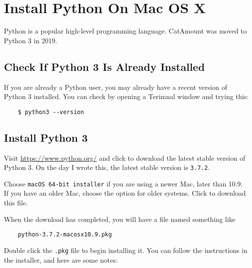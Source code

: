 \chapter{Install Python On Mac OS X}
\hypertarget{macosx-install-python}{}

Python is a popular high-level programming language. CatAmount was
moved to Python 3 in 2019.

\section{Check If Python 3 Is Already Installed}

If you are already a Python user, you may already have a recent
version of Python 3 installed. You can check by opening a Terimnal
window and trying this:

\begin{verbatim}
    $ python3 --version
\end{verbatim}

\section{Install Python 3}

Visit \url{https://www.python.org/} and click to download the latest
stable version of Python 3. On the day I wrote this, the latest stable
version is \texttt{3.7.2}.

Choose \texttt{macOS 64-bit installer} if you are using a newer
Mac, later than 10.9. If you have an older Mac, choose the option
for older systems. Click to download this file.

When the download has completed, you will have a file named something
like

\begin{verbatim}
    python-3.7.2-macosx10.9.pkg
\end{verbatim}

Double click the \texttt{.pkg} file to begin installing it. You can
follow the instructions in the installer, and here are some notes:

